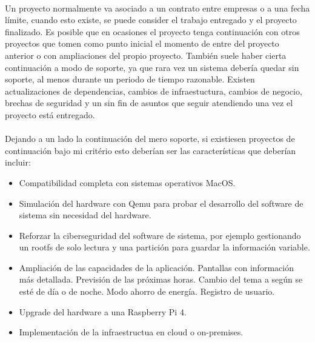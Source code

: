 \paragraph{}Un proyecto normalmente va asociado a un contrato entre empresas o a una
fecha límite, cuando esto existe, se puede consider el trabajo entregado y el proyecto
finalizado. Es posible que en ocasiones el proyecto tenga continuación con otros proyectos
que tomen como punto inicial el momento de entre del proyecto anterior o con ampliaciones
del propio proyecto. También suele haber cierta continuación a modo de soporte, ya que
rara vez un sistema debería quedar sin soporte, al menos durante un periodo de tiempo
razonable. Existen actualizaciones de dependencias, cambios de infraestuctura, cambios
de negocio, brechas de seguridad y un sin fin de asuntos que seguir atendiendo una vez
el proyecto está entregado.

\paragraph{}Dejando a un lado la continuación del mero soporte, si existiesen proyectos
de continuación bajo mi critério esto deberían ser las características que deberían
incluir:

\begin{itemize}
    \item Compatibilidad completa con sistemas operativos MacOS.
    \item Simulación del hardware con Qemu para probar el desarrollo del software de
    sistema sin necesidad del hardware.
    \item Reforzar la ciberseguridad del software de sistema, por ejemplo gestionando
    un rootfs de solo lectura y una partición para guardar la información variable.
    \item Ampliación de las capacidades de la aplicación.
        \subitem Pantallas con información más detallada.
        \subitem Previsión de las próximas horas.
        \subitem Cambio del tema a según se esté de día o de noche.
        \subitem Modo ahorro de energía.
        \subitem Registro de usuario.
    \item Upgrade del hardware a una Raspberry Pi 4.
    \item Implementación de la infraestructua en cloud o on-premises.

\end{itemize}



